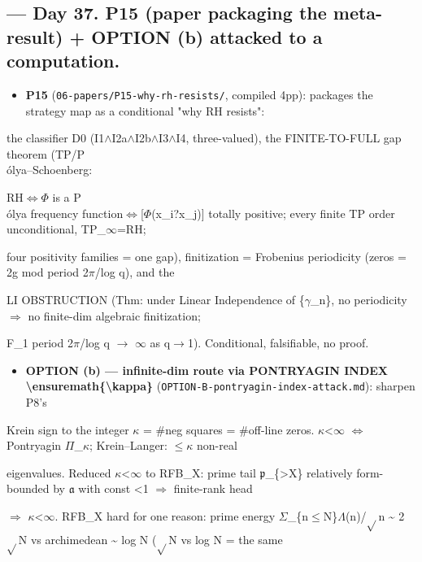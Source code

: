 \documentclass[10pt]{article}
\begin{document}
\subsection*{ --- Day 37. P15 (paper packaging the meta-result) + OPTION (b) attacked to a computation.}
\begin{itemize}
\item \textbf{P15} (\texttt{06-papers/P15-why-rh-resists/}, compiled 4pp): packages the strategy map as a conditional "why RH resists":
\end{itemize}
  the classifier D0 (I1\ensuremath{\wedge}I2a\ensuremath{\wedge}I2b\ensuremath{\wedge}I3\ensuremath{\wedge}I4, three-valued), the FINITE-TO-FULL gap theorem (TP/P\\\'olya--Schoenberg:\par
  RH\ensuremath{\iff}\ensuremath{\Phi} is a P\\\'olya frequency function\ensuremath{\iff}[\ensuremath{\Phi}(x\_i?x\_j)] totally positive; every finite TP order unconditional, TP\_\ensuremath{\infty}=RH;\par
  four positivity families = one gap), finitization = Frobenius periodicity (zeros = 2g mod period 2\ensuremath{\pi}/log q), and the\par
  LI OBSTRUCTION (Thm: under Linear Independence of \{\ensuremath{\gamma}\_n\}, no periodicity \ensuremath{\Rightarrow} no finite-dim algebraic finitization;\par
  F\_1 period 2\ensuremath{\pi}/log q \ensuremath{\to} \ensuremath{\infty} as q\ensuremath{\to}1). Conditional, falsifiable, no proof.\par
\begin{itemize}
\item \textbf{OPTION (b) --- infinite-dim route via PONTRYAGIN INDEX \textbackslash{}ensuremath\{\textbackslash{}kappa\}} (\texttt{OPTION-B-pontryagin-index-attack.md}): sharpen P8's
\end{itemize}
  Krein sign to the integer \ensuremath{\kappa} = \#neg squares = \#off-line zeros. \ensuremath{\kappa}<\ensuremath{\infty} \ensuremath{\iff} Pontryagin \ensuremath{\Pi}\_\ensuremath{\kappa}; Krein--Langer: \ensuremath{\le}\ensuremath{\kappa} non-real\par
  eigenvalues. Reduced \ensuremath{\kappa}<\ensuremath{\infty} to RFB\_X: prime tail \ensuremath{\mathfrak{p}}\_\{>X\} relatively form-bounded by \ensuremath{\mathfrak{a}} with const <1 \ensuremath{\Rightarrow} finite-rank head\par
  \ensuremath{\Rightarrow} \ensuremath{\kappa}<\ensuremath{\infty}. RFB\_X hard for one reason: prime energy \ensuremath{\Sigma}\_\{n\ensuremath{\le}N\}\ensuremath{\Lambda}(n)/\ensuremath{\sqrt{}}n \textasciitilde{} 2\ensuremath{\sqrt{}}N vs archimedean \textasciitilde{} log N (\ensuremath{\sqrt{}}N vs log N = the same\par
\end{document}

